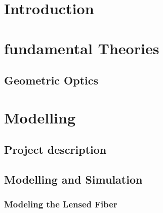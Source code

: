 
\chapter{Introduction}


\chapter{fundamental Theories}
\label{chp:background}
%
\section{Geometric Optics}
\label{sect:background_optics}
%

%

%
%

%

\chapter{Modelling}
\label{chp:model}

\section{Project description}

\section{Modelling and Simulation}

\subsection{Modeling the Lensed Fiber}
\label{sect:model_model_model_TLF}

